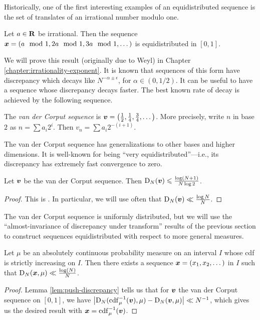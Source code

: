 Historically, one of the first interesting examples of an equidistributed 
sequence is the set of translates  of an irrational number modulo one. 

\begin{theorem}
Let $a\in \mathbf{R}$ be irrational. Then the sequence 
${\boldsymbol x}=(a\mod 1,2a\mod 1,3a\mod 1,\dots)$ is equidistributed in $[0,1]$. 
\end{theorem}

We will prove this result (originally due to Weyl) in Chapter \ref{chapter:irrationality-exponent}. It is known that sequences of this form 
have discrepancy which decays like $N^{-\alpha\pm \epsilon}$, for 
$\alpha\in (0,1/2)$. It can be useful to have a sequence whose discrepancy 
decays faster. The best known rate of decay is achieved by the following 
sequence. 

\begin{definition}
The \emph{van der Corput sequence} is 
${\boldsymbol v} = \left(\frac 1 2,\frac 1 4,\frac 3 4,\dots\right)$. More precisely, 
write $n$ in base $2$ as $n = \sum a_i 2^i$. Then $v_n = \sum a_i 2^{-(i+1)}$. 
\end{definition}

The van der Corput sequence has generalizations to other bases and higher 
dimensions. It is well-known for being ``very equidistributed''---i.e., its 
discrepancy has extremely fast convergence to zero. 

\begin{lemma}
Let ${\boldsymbol v}$ be the van der Corput sequence. Then
$\operatorname{D}_N({\boldsymbol v}) \leqslant \frac{\log(N+1)}{N\log 2}$. 
\end{lemma}
\begin{proof}
This is \cite[Ch.~2 Th.~3.5]{kuipers-niederreiter-1974}. In particular, we 
will use often that $\operatorname{D}_N({\boldsymbol v})\ll \frac{\log N}{N}$. 
\end{proof}

The van der Corput sequence is uniformly distributed, but we will use the 
``almost-invariance of discrepancy under transform'' results of the previous 
section to construct sequences equidistributed with respect to more 
general measures. 

\begin{theorem}\label{thm:van-der-corput}
Let $\mu$ be an absolutely continuous probability measure on an interval $I$  
whose cdf is strictly increasing on $I$. Then there exists a sequence 
${\boldsymbol x}=(x_1,x_2,\dots)$ in $I$ such that $\operatorname{D}_N({\boldsymbol x},\mu) \ll \frac{\log(N)}{N}$. 
\end{theorem}
\begin{proof}
Lemma \ref{lem:push-discrepancy} tells us that for ${\boldsymbol v}$ the van der Corput 
sequence on $[0,1]$, we have 
$\left|\operatorname{D}_N(\operatorname{cdf}_\mu^{-1}({\boldsymbol v}), \mu) - \operatorname{D}_N({\boldsymbol v},\mu)\right| \ll N^{-1}$, 
which gives us the desired result with ${\boldsymbol x} = \operatorname{cdf}_\mu^{-1}({\boldsymbol v})$. 
\end{proof}

